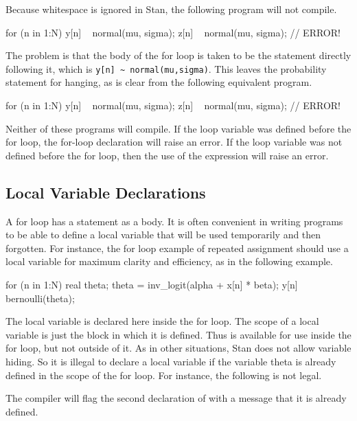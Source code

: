 Because whitespace is ignored in Stan, the following program will
not compile.
%
\begin{stancode}
for (n in 1:N)
  y[n] ~ normal(mu, sigma);
  z[n] ~ normal(mu, sigma); // ERROR!
\end{stancode}
%
The problem is that the body of the for loop is taken to be the
statement directly following it, which is
\Verb|y[n] ~ normal(mu,sigma)|.  This leaves the probability statement for
 hanging, as is clear from the following equivalent
program.
%
\begin{stancode}
for (n in 1:N) {
  y[n] ~ normal(mu, sigma);
}
z[n] ~ normal(mu, sigma); // ERROR!
\end{stancode}
%
Neither of these programs will compile. If the loop variable 
was defined before the for loop, the for-loop declaration will raise
an error.  If the loop variable  was not defined before the
for loop, then the use of the expression  will raise an
error.

\subsection{Local Variable Declarations}

A for loop has a statement as a body.  It is often convenient in
writing programs to be able to define a local variable that will be
used temporarily and then forgotten.  For instance, the for loop
example of repeated assignment should use a local variable for maximum
clarity and efficiency, as in the following example.
%
\begin{stancode}
for (n in 1:N) {
  real theta;
  theta = inv_logit(alpha + x[n] * beta);
  y[n] ~ bernoulli(theta);
}
\end{stancode}
%
The local variable  is declared here inside the for loop.
The scope of a local variable is just the block in which it is
defined.  Thus  is available for use inside the for loop,
but not outside of it.  As in other situations, Stan does not allow
variable hiding.  So it is illegal to declare a local variable
 if the variable theta is already defined in the scope of
the for loop.  For instance, the following is not legal.
%
\begin{stancode}
for (m in 1:M) {
  real theta;
  for (n in 1:N) {
    real theta; // ERROR!
    theta = inv_logit(alpha + x[m, n] * beta);
    y[m, n] ~ bernoulli(theta);
// ...
\end{stancode}
%
The compiler will flag the second declaration of  with a
message that it is already defined.

